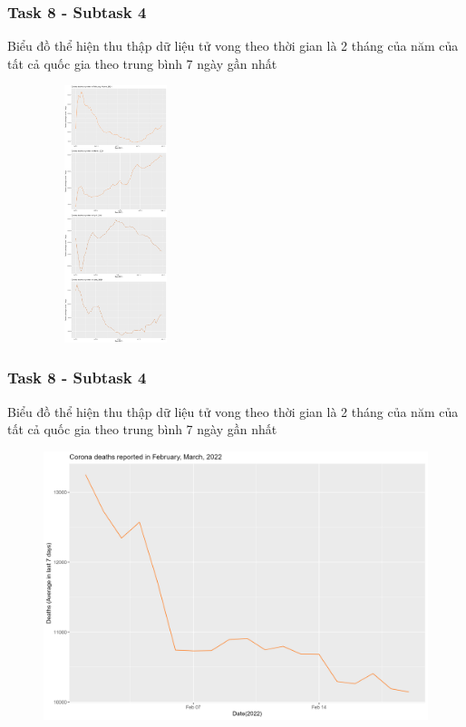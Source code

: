 \documentclass[english,10pt,table]{beamer}
\begin{document}
{
    \frametitle{Task 8 - Subtask 4}
    \begin{block}{Biểu đồ thể hiện thu thập dữ liệu tử vong theo thời gian là 2 tháng của năm của tất cả quốc gia theo trung bình 7 ngày gần nhất}
    \begin{figure}[H]
			\centering
			\includegraphics[height=7.5cm,width=4.2cm]{images/8.4.2.png}
	\end{figure}
    \end{block}
}
\frame
{
    \frametitle{Task 8 - Subtask 4}
    \begin{block}{Biểu đồ thể hiện thu thập dữ liệu tử vong theo thời gian là 2 tháng của năm của tất cả quốc gia theo trung bình 7 ngày gần nhất}
    \begin{figure}[H]
			\centering
			\includegraphics[scale=0.1]{images/8.4.3.png}
	\end{figure}
    \end{block}
}
\frame
\end{document}

